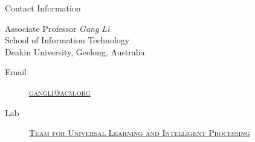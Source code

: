 \documentclass[
 size=12pt,
 paper=smartboard, %
 mode=present, %
 display=slides, %
style=tuliplab,
pauseslide,
fleqn,leqno]{powerdot}
\begin{document}
\begin{wideslide}[toc=,bm=]{Contact Information}
\centering
{}
\twocolumn[
lcolwidth=0.35\linewidth,
rcolwidth=0.65\linewidth
]
{
}
{
Associate Professor \emph{Gang Li}\\
School of Information Technology\\
Deakin University, Geelong, Australia
\begin{description}
 \item[Email] \href{mailto:gangli@acm.org}
 {\textsc{\footnotesize{gangli@acm.org}}}
 
 \item[Lab] \href{http://www.tulip.org.au}
 {\textsc{\footnotesize{Team for Universal Learning and Intelligent Processing}}} 
\end{description}
} 
\end{wideslide}
\end{document}
